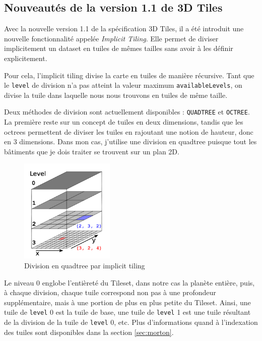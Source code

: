 \subsection{Nouveautés de la version 1.1 de 3D Tiles}

Avec la nouvelle version 1.1 de la spécification 3D Tiles, il a été introduit une nouvelle fonctionnalité appelée \textit{Implicit Tiling}. Elle permet de diviser implicitement un dataset en tuiles de mêmes tailles sans avoir à les définir explicitement.

Pour cela, l'implicit tiling divise la carte en tuiles de manière récursive. Tant que le \texttt{level} de division n'a pas atteint la valeur maximum \texttt{availableLevels}, on divise la tuile dans laquelle nous nous trouvons en tuiles de même taille.

Deux méthodes de division sont actuellement disponibles : \texttt{QUADTREE} et \texttt{OCTREE}. La première reste sur un concept de tuiles en deux dimensions, tandis que les octrees permettent de diviser les tuiles en rajoutant une notion de hauteur, donc en 3 dimensions. Dans mon cas, j'utilise une division en quadtree puisque tout les bâtiments que je dois traiter se trouvent sur un plan 2D.

\begin{figure}[H]
    \centering
    \includegraphics[width=0.4\textwidth]{assets/figures/implicit-tiling-small.png}
    \caption{Division en quadtree par implicit tiling \cite{3d-tiles-specification}}
    \label{fig:implicit-tiling}
\end{figure}

Le niveau 0 englobe l'entièreté du Tileset, dans notre cas la planète entière, puis, à chaque division, chaque tuile correspond non pas à une profondeur supplémentaire, mais à une portion de plus en plus petite du Tileset. Ainsi, une tuile de \texttt{level} 0 est la tuile de base, une tuile de \texttt{level} 1 est une tuile résultant de la division de la tuile de \texttt{level} 0, etc. Plus d'informations quand à l'indexation des tuiles sont disponibles dans la section \ref{sec:morton}.

